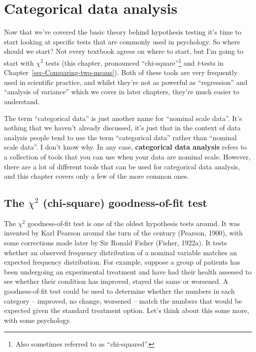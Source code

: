 \documentclass[
  a4paper,
]{book}
\begin{document}
\hypertarget{sec-Categorical-data-analysis}{%
\chapter{Categorical data
analysis}\label{sec-Categorical-data-analysis}}

Now that we've covered the basic theory behind hypothesis testing it's
time to start looking at specific tests that are commonly used in
psychology. So where should we start? Not every textbook agrees on where
to start, but I'm going to start with \(\chi^2\) tests (this chapter,
pronounced ``chi-square''\footnote{Also sometimes referred to as
  ``chi-squared''.} and \emph{t}-tests in
Chapter~\ref{sec-Comparing-two-means}). Both of these tools are very
frequently used in scientific practice, and whilst they're not as
powerful as ``regression'' and ``analysis of variance'' which we cover
in later chapters, they're much easier to understand.

The term ``categorical data'' is just another name for ``nominal scale
data''. It's nothing that we haven't already discussed, it's just that
in the context of data analysis people tend to use the term
``categorical data'' rather than ``nominal scale data''. I don't know
why. In any case, \textbf{categorical data analysis} refers to a
collection of tools that you can use when your data are nominal scale.
However, there are a lot of different tools that can be used for
categorical data analysis, and this chapter covers only a few of the
more common ones.

\hypertarget{the-chi2-chi-square-goodness-of-fit-test}{%
\section{\texorpdfstring{The \(\chi^2\) (chi-square) goodness-of-fit
test}{The \textbackslash chi\^{}2 (chi-square) goodness-of-fit test}}\label{the-chi2-chi-square-goodness-of-fit-test}}

The \(\chi^2\) goodness-of-fit test is one of the oldest hypothesis
tests around. It was invented by Karl Pearson around the turn of the
century (Pearson, 1900), with some corrections made later by Sir Ronald
Fisher (Fisher, 1922a). It tests whether an observed frequency
distribution of a nominal variable matches an expected frequency
distribution. For example, suppose a group of patients has been
undergoing an experimental treatment and have had their health assessed
to see whether their condition has improved, stayed the same or
worsened. A goodness-of-fit test could be used to determine whether the
numbers in each category -- improved, no change, worsened -- match the
numbers that would be expected given the standard treatment option.
Let's think about this some more, with some psychology.
\end{document}

